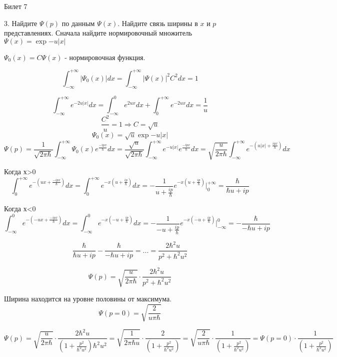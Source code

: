 \begin{center}
	Билет 7	
\end{center}
3. Найдите $\Psi(p)$ по данным $\Psi(x)$. Найдите связь ширины в $x$ и $p$ представлениях. Сначала найдите нормировочный множитель $\Psi(x)=\exp{-u|x|}$


$\Psi_0(x)=C\Psi(x)$ - нормировочная функция.

$$\int_{-\infty}^{+\infty}|\Psi_0(x)|dx = \int_{-\infty}^{+\infty}|\Psi(x)|^2C^2dx=1$$

$$\int_{-\infty}^{+\infty} e^{-2u|x|}dx=\int_{-\infty}^{0} e^{2ux}dx+\int_{0}^{+\infty} e^{-2ux}dx=\frac{1}{u}$$
$$\frac{C^2}{u}=1 \Longrightarrow C=\sqrt{u}$$
$$\Psi_0(x)=\sqrt{u}\exp{-u|x|}$$
$$\Psi(p)=\frac{1}{\sqrt{2\pi \hbar}}\int_{-\infty}^{+\infty} \Psi_0(x) e^{\frac{-ipx}{\hbar}}dx=\frac{\sqrt{u}}{\sqrt{2\pi \hbar}}\int_{-\infty}^{+\infty} e^{-u|x|} e^{\frac{-ipx}{\hbar}}dx=\sqrt{\frac{u}{2\pi \hbar}}\int_{-\infty}^{+\infty} e^{-(u|x|+\frac{ipx}{\hbar})}dx$$

Когда х>0
$$\int_{0}^{+\infty} e^{-(ux+\frac{-ipx}{\hbar})}dx=\int_{0}^{+\infty} e^{-x(u+\frac{ip}{\hbar})}dx=-\frac{1}{u+\frac{ip}{\hbar}}e^{-x(u+\frac{ip}{\hbar})} \bigg|_0^{+\infty}=\frac{\hbar}{\hbar u+ip}$$

Когда х<0
$$\int_{-\infty}^{0} e^{-(-ux+\frac{-ipx}{\hbar})}dx=\int_{-\infty}^{0} e^{-x(-u+\frac{ip}{\hbar})}dx=-\frac{1}{-u+\frac{ip}{\hbar}}e^{-x(-u+\frac{ip}{\hbar})} \bigg|_{-\infty}^0=-\frac{\hbar}{-\hbar u+ip}$$

$$\frac{\hbar}{\hbar u+ip}-\frac{\hbar}{-\hbar u+ip}=...=\frac{2\hbar ^2u}{p^2+\hbar ^2u^2}$$


$$\Psi(p)=\sqrt{\frac{u}{2\pi \hbar}} \cdot \frac{2\hbar ^2u}{p^2+\hbar ^2u^2}$$


 Ширина находится на уровне половины от максимума.
 $$\Psi(p=0)=\sqrt{\frac{2}{u\pi \hbar}}$$

 $$\Psi(p)=\sqrt{\frac{u}{2\pi \hbar}} \cdot \frac{2\hbar ^2u}{(1+\frac{p^2}{\hbar ^2u^2})\hbar ^2u^2}=\sqrt{\frac{1}{2\pi \hbar u}} \cdot \frac{2}{(1+\frac{p^2}{\hbar ^2u^2})}=\sqrt{\frac{2}{u\pi \hbar}} \cdot \frac{1}{(1+\frac{p^2}{\hbar ^2u^2})}=\Psi(p=0)\cdot \frac{1}{(1+\frac{p^2}{\hbar ^2u^2})}$$

